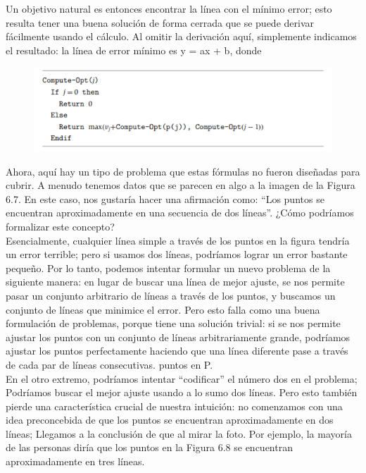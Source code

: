\documentclass[a4paper, 12pt]{book}
\theoremstyle{dotless}
\begin{document}
Un objetivo natural es entonces encontrar la línea con el mínimo error; esto resulta tener una buena solución de forma cerrada que se puede derivar fácilmente usando el cálculo. Al omitir la derivación aquí, simplemente indicamos el resultado: la línea de error mínimo es y = ax + b, donde


\begin{figure}[h]
\centering
\includegraphics[scale=1]{Imagenes-Seccion6/cod6_1.PNG}
\end{figure}

Ahora, aquí hay un tipo de problema que estas fórmulas no fueron diseñadas para cubrir. A menudo tenemos datos que se parecen en algo a la imagen de la Figura 6.7. En este caso, nos gustaría hacer una afirmación como: ``Los puntos se encuentran aproximadamente en una secuencia de dos líneas''. ¿Cómo podríamos formalizar este concepto?\\

Esencialmente, cualquier línea simple a través de los puntos en la figura tendría un error terrible; pero si usamos dos líneas, podríamos lograr un error bastante pequeño. Por lo tanto, podemos intentar formular un nuevo problema de la siguiente manera: en lugar de buscar una línea de mejor ajuste, se nos permite pasar un conjunto arbitrario de líneas a través de los puntos, y buscamos un conjunto de líneas que minimice el error. Pero esto falla como una buena formulación de problemas, porque tiene una solución trivial: si se nos permite ajustar los puntos con un conjunto de líneas arbitrariamente grande, podríamos ajustar los puntos perfectamente haciendo que una línea diferente pase a través de cada par de líneas consecutivas. puntos en P.\\

En el otro extremo, podríamos intentar ``codificar'' el número dos en el problema; Podríamos buscar el mejor ajuste usando a lo sumo dos líneas. Pero esto también pierde una característica crucial de nuestra intuición: no comenzamos con una idea preconcebida de que los puntos se encuentran aproximadamente en dos líneas; Llegamos a la conclusión de que al mirar la foto. Por ejemplo, la mayoría de las personas diría que los puntos en la Figura 6.8 se encuentran aproximadamente en tres líneas.\\
\end{document}
